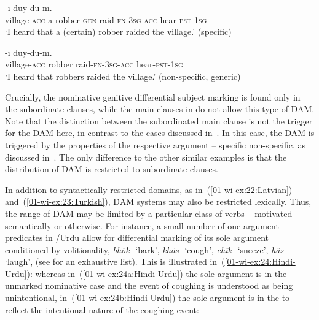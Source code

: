 \documentclass[output=paper]{LSP/langsci}
\begin{document}
\ea\label{01-wi-ex:23:Turkish}
\begin{xlist}

\ex\label{01-wi-ex:23a:Turkish}
	-ı		duy-du-m.\\
	village-\textsc{acc}	a	robber-\textsc{gen}	raid-\textsc{fn}-\textsc{3sg}-\textsc{acc}	hear-\textsc{pst}-\textsc{1sg}\\
	\glt ‘I heard that a (certain) robber raided the village.’ (specific) %

\ex\label{01-wi-ex:23b:Turkish}
	-ı		duy-du-m.\\
	village-\textsc{acc}	robber		raid-\textsc{fn}-\textsc{3sg}-\textsc{acc}	hear-\textsc{pst}-\textsc{1sg}\\
	\glt ‘I heard that robbers raided the village.’ (non-specific, generic) %
\end{xlist}
\z

\noindent Crucially, the nominative \vs genitive differential subject marking is found only in the subordinate clauses, while the main clauses in  do not allow this type of DAM. 
Note that the distinction between the subordinated \vs main clause is not the trigger for the DAM here, in contrast to the cases discussed in~. 
In this case, the DAM is triggered by the properties of the respective argument – specific \vs non-specific, as discussed in~.%
The only difference to the other similar examples is that the distribution of DAM is restricted to subordinate clauses.

In addition to syntactically restricted domains, as in~(\ref{01-wi-ex:22:Latvian}) and~(\ref{01-wi-ex:23:Turkish}), DAM systems may also be restricted lexically. 
Thus, the range of DAM may be limited by a particular class of verbs – motivated semantically or otherwise. 
For instance, a small number of one-argument predicates in /Urdu allow for differential marking of its sole argument conditioned by volitionality, \eg \textit{bhõk-} ‘bark’, \textit{khãs-} ‘cough’, \textit{chĩk-} ‘sneeze’, \textit{hãs-} ‘laugh’, \etc (see \citealt{Davison1999Ergativity} for an exhaustive list). 
This is illustrated in~(\ref{01-wi-ex:24:Hindi-Urdu}): whereas in~(\ref{01-wi-ex:24a:Hindi-Urdu}) the sole argument is in the unmarked nominative case and the event of coughing is understood as being unintentional, in~(\ref{01-wi-ex:24b:Hindi-Urdu}) the sole argument is in the  to reflect the intentional nature of the coughing event:
\end{document}
